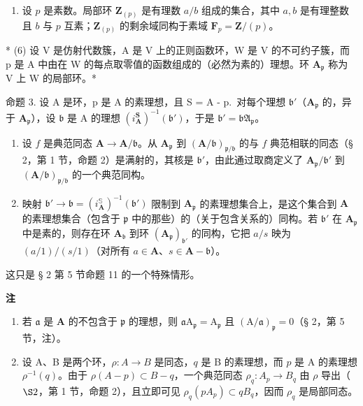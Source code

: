 \begin{enumerate}
\def\labelenumi{(\arabic{enumi})}
\setcounter{enumi}{4}
\tightlist
\item
  设 \(p\) 是素数。局部环 \(\mathbf{Z}_{(p)}\) 是有理数 \(a / b\) 组成的集合，其中 \(a, b\) 是有理整数且 \(b\) 与 \(p\) 互素；\(\mathbf{Z}_{(p)}\) 的剩余域同构于素域 \(\mathbf{F}_p = \mathbf{Z} / (p)\)。
\end{enumerate}

* (6) 设 V 是仿射代数簇，A 是 V 上的正则函数环，W 是 V 的不可约子簇，而 p 是 A 中由在 W 的每点取零值的函数组成的（必然为素的）理想。环 \(\mathbf{A}_{\mathfrak{p}}\) 称为 V 上 W 的局部环。*

命题 3. 设 A 是环，p 是 A 的素理想，且 S = A - p.~对每个理想 \(\mathfrak{b}'\)（\(\mathbf{A}_{\mathfrak{p}}\) 的，异于 \(\mathbf{A}_{\mathfrak{p}}\)），设 \(\mathfrak{b}\) 是 A 的理想 \((i_{\mathbf{A}}^{\mathbf{S}})^{-1}(\mathfrak{b}')\)，于是 \(\mathfrak{b}' = \mathfrak{bA}_{\mathfrak{p}}\)。

\begin{enumerate}
\def\labelenumi{(\roman{enumi})}
\item
  设 \(f\) 是典范同态 \(\mathbf{A} \to \mathbf{A} / \mathfrak{b}\)。从 \(\mathbf{A}_{\mathfrak{p}}\) 到 \((\mathbf{A} / \mathfrak{b})_{\mathfrak{p} / \mathfrak{b}}\) 的与 \(f\) 典范相联的同态（§ 2，第 1 节，命题 2）是满射的，其核是 \(\mathfrak{b}'\)，由此通过取商定义了 \(\mathbf{A}_{\mathfrak{p}} / \mathfrak{b}'\) 到 \((\mathbf{A} / \mathfrak{b})_{\mathfrak{p} / \mathfrak{b}}\) 的一个典范同构。
\item
  映射 \(\mathfrak{b}' \to \mathfrak{b} = (i_{\mathbf{A}}^{\mathbb{S}})^{-1}(\mathfrak{b}')\) 限制到 \(\mathbf{A}_{\mathfrak{p}}\) 的素理想集合上，是这个集合到 \(\mathbf{A}\) 的素理想集合（包含于 \(\mathfrak{p}\) 中的那些）的（关于包含关系的）同构。若 \(\mathfrak{b}'\) 在 \(\mathbf{A}_{\mathfrak{p}}\) 中是素的，则存在环 \(\mathbf{A}_{\mathfrak{b}}\) 到环 \((\mathbf{A}_{\mathfrak{p}})_{\mathfrak{b}'}\) 的同构，它把 \(a / s\) 映为 \((a / 1) / (s / 1)\)（对所有 \(a \in \mathbf{A}\)、\(s \in \mathbf{A} - \mathfrak{b}\)）。
\end{enumerate}

这只是 § 2 第 5 节命题 11 的一个特殊情形。

\textbf{注}\par

\begin{enumerate}
\def\labelenumi{(\arabic{enumi})}
\setcounter{enumi}{2}
\item
  若 \(\mathfrak{a}\) 是 \(\mathbf{A}\) 的不包含于 \(\mathfrak{p}\) 的理想，则 \(\mathfrak{a}\mathrm{A}_{\mathfrak{p}} = \mathrm{A}_{\mathfrak{p}}\) 且 \((\mathrm{A} / \mathfrak{a})_{\mathfrak{p}} = 0\)（§ 2，第 5 节，注）。
\item
  设 A、B 是两个环，\(\rho: A \to B\) 是同态，\(q\) 是 B 的素理想，而 \(p\) 是 A 的素理想 \(\rho^{-1}(q)\)。由于 \(\rho(A - p) \subset B - q\)，一个典范同态 \(\rho_q: A_p \to B_q\) 由 \(\rho\) 导出（\(\S 2\)，第 1 节，命题 2），且立即可见 \(\rho_q(pA_p) \subset qB_q\)，因而 \(\rho_q\) 是局部同态。
\end{enumerate}
\relax{}
